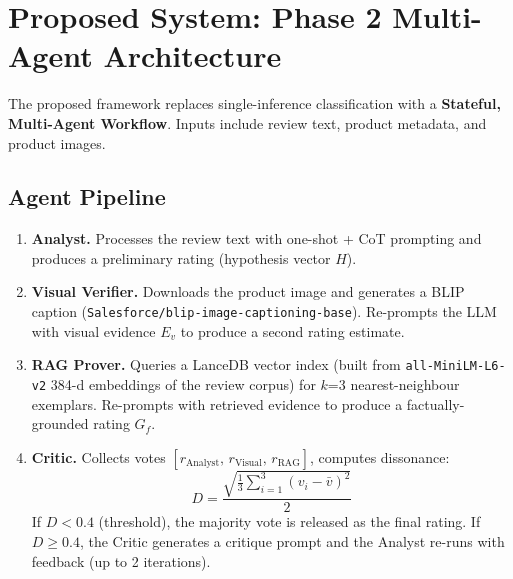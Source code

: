 \documentclass[12pt,a4paper]{article}
\begin{document}
\section{Proposed System: Phase 2 Multi-Agent Architecture}

The proposed framework replaces single-inference classification with a \textbf{Stateful,
Multi-Agent Workflow}. Inputs include review text, product metadata, and product images.

\subsection{Agent Pipeline}

\begin{enumerate}[leftmargin=*]
  \item \textbf{Analyst.} Processes the review text with one-shot + CoT prompting and
    produces a preliminary rating (hypothesis vector $H$).

  \item \textbf{Visual Verifier.} Downloads the product image and generates a BLIP
    caption (\texttt{Salesforce/blip-image-captioning-base}). Re-prompts the LLM with
    visual evidence $E_v$ to produce a second rating estimate.

  \item \textbf{RAG Prover.} Queries a LanceDB vector index (built from \texttt{all-MiniLM-L6-v2}
    384-d embeddings of the review corpus) for $k$=3 nearest-neighbour exemplars.
    Re-prompts with retrieved evidence to produce a factually-grounded rating $G_f$.

  \item \textbf{Critic.} Collects votes $[r_{\text{Analyst}},\, r_{\text{Visual}},\, r_{\text{RAG}}]$,
    computes dissonance:
    \[
      D = \frac{\sqrt{\frac{1}{3}\sum_{i=1}^{3}(v_i - \bar{v})^2}}{2}
    \]
    If $D < 0.4$ (threshold), the majority vote is released as the final rating. If
    $D \geq 0.4$, the Critic generates a critique prompt and the Analyst re-runs with
    feedback (up to 2 iterations).
\end{enumerate}
\end{document}
